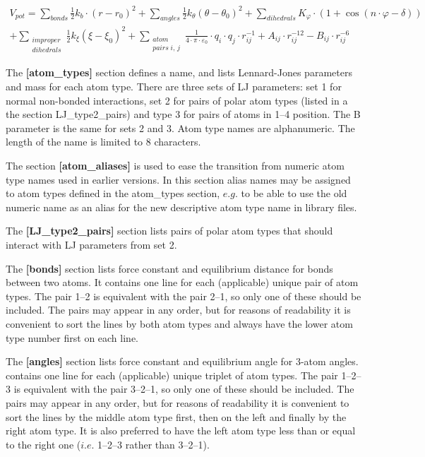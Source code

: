 \documentclass[a4paper,10pt]{article}
\begin{document}
\begin {equation}
\begin{split}
\label{eq:V_pot2}
 V_{pot} =\sum\limits_{bonds} {\frac{1}{2}k_b \cdot \left( {r-r_0
} \right)^2} +\sum\limits_{angles} {\frac{1}{2}k_\theta \left(
{\theta -\theta_0} \right)^2} +\sum\limits_{dihedrals} {K_\varphi
\cdot \left( {1+\cos \left( {n\cdot \varphi -\delta } \right)}
\right)} \nonumber \\
  +\sum\limits_{\substack{improper \\ dihedrals}}
{\frac{1}{2}k_\xi \left( {\xi -\xi _0} \right)^2}
+\sum\limits_{\substack{atom \\ pairs \; i , \, j}}
{\frac{1}{4\cdot \pi \cdot \varepsilon_0 } \cdot q_i \cdot q_j
\cdot r_{ij}^{-1} +A_{ij} \cdot r_{ij}^{-12} -B_{ij} \cdot
r_{ij}^{-6} }
\end{split}
\end{equation}

The  \textbf{[atom{\_}types]}  section  defines   a  name,  and  lists
Lennard-Jones parameters and mass for  each atom type. There are three
sets of LJ parameters: set 1 for normal non-bonded interactions, set 2
for   pairs  of   polar  atom   types   (listed  in   a  the   section
LJ{\_}type2{\_}pairs)  and  type   3  for  pairs  of   atoms  in  1--4
position. The  B parameter  is the same  for sets 2  and 3.  Atom type
names  are alphanumeric.  The  length  of the  name  is  limited to  8
characters.

The section \textbf{[atom{\_}aliases]} is  used to ease the transition
from  numeric atom  type  names  used in  earlier  versions.  In  this
section  alias names  may be  assigned to  atom types  defined in  the
atom{\_}types section, $e.g.$  to be able to use the  old numeric name
as an alias for the new descriptive atom type name in library files.

The \textbf{[LJ{\_}type2{\_}pairs]} section lists  pairs of polar atom
types that should interact with LJ parameters from set 2.

The  \textbf{[bonds]} section  lists  force  constant and  equilibrium
distance for  bonds between two atoms.  It contains one line  for each
(applicable) unique  pair of atom  types. The pair 1--2  is equivalent
with the pair 2--1, so only one of these should be included. The pairs
may  appear  in any  order,  but  for  reasons  of readability  it  is
convenient to  sort the lines by  both atom types and  always have the
lower atom type number first on each line.

The  \textbf{[angles]} section  lists force  constant and  equilibrium
angle  for 3-atom  angles.  contains one  line  for each  (applicable)
unique triplet of atom types. The  pair 1--2--3 is equivalent with the
pair 3--2--1, so  only one of these should be  included. The pairs may
appear in any  order, but for reasons of readability  it is convenient
to sort the lines by the middle  atom type first, then on the left and
finally by the right atom type. It  is also preferred to have the left
atom type less  than or equal to the right  one ($i.e.$ 1--2--3 rather
than 3--2--1).
\end{document}
